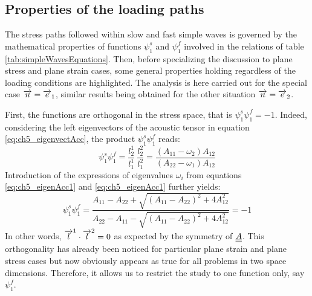 
\subsection{Properties of the loading paths}
The stress paths followed within slow and fast simple waves is governed by the mathematical properties of functions $\psi^s_1$ and $\psi^f_1$ involved in the relations of table \ref{tab:simpleWavesEquations}.
Then, before specializing the discussion to plane stress and plane strain cases, some general properties holding regardless of the loading conditions are highlighted.
The analysis is here carried out for the special case ${\overrightarrow{n}}={\overrightarrow{e}}_1$, similar results being obtained for the other situation ${\overrightarrow{n}}={\overrightarrow{e}}_2$.

First, the functions are orthogonal in the stress space, that is $\psi^s_1\psi^f_1=-1$.
Indeed, considering the left eigenvectors of the acoustic tensor in equation \eqref{eq:ch5_eigenvectAcc}, the product $\psi^s_1\psi^f_1$ reads:
\begin{equation*}
  \psi^s_1\psi^f_1 = \frac{l^1_2}{l^1_1}\: \frac{l_2^2}{l^2_1} = \frac{(A_{11}-\omega_2)A_{12}}{(A_{22}-\omega_1)A_{12}}
\end{equation*}
Introduction of the expressions of eigenvalues $\omega_i$ from equations \eqref{eq:ch5_eigenAcc1} and \eqref{eq:ch5_eigenAcc1} further yields:
\begin{equation*}
  \psi^s_1\psi^f_1 = \frac{A_{11} -A_{22} +\sqrt{(A_{11} -A_{22} )^2 + 4A_{12}^2 }}{A_{22} -A_{11} -\sqrt{(A_{11} -A_{22} )^2 + 4A_{12}^2 }}=-1
\end{equation*}
In other words, ${\overrightarrow{l}}^1 \cdot {\overrightarrow{l}}^2=0$ as expected by the symmetry of ${\underline{\underline{A}}}$.
This orthogonality has already been noticed for particular plane strain and plane stress cases \cite{Clifton,Ting68} but now obviously appears as true for all problems in two space dimensions.
Therefore, it allows us to restrict the study to one function only, say $\psi_1^f$.

